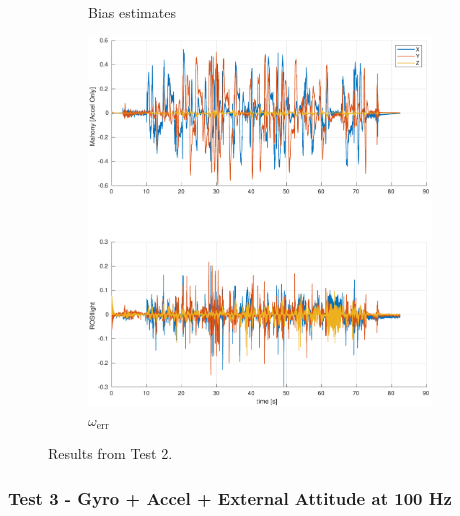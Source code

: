 \documentclass[a4paper]{article}
\begin{document}
\begin{figure}[H]
\begin{subfigure}[t]{0.31\textwidth}
    \caption{Bias estimates}
    \label{fig:scf_est}
  \end{subfigure}\hfill
  \begin{subfigure}[t]{0.31\textwidth}
    \includegraphics[width=\textwidth]{werr_ext100.pdf}
    \caption{$\omega_\text{err}$}
    \label{fig:scf_bode}
  \end{subfigure}
  \caption{Results from Test 2.}
  \label{fig:scf}
\end{figure}

\subsubsection*{Test 3 - Gyro + Accel + External Attitude at 100 Hz}
\end{document}
